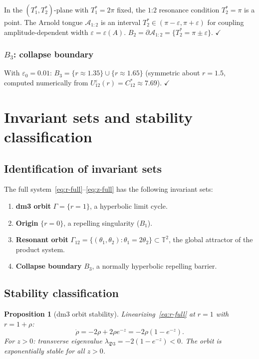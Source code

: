 \documentclass[12pt, oneside]{book}
\theoremstyle{plain}
\newtheorem{proposition}[theorem]{Proposition}
\theoremstyle{definition}
\theoremstyle{remark}
\newcommand{\T}{\mathbb{T}}
\newcommand{\dm}{\mathfrak{D}}
\newcommand{\Orb}{\Gamma}
\newcommand{\eps}{\varepsilon}
\begin{document}
In the $(T_1^*,T_2^*)$-plane with $T_1^*=2\pi$ fixed, the $1$:$2$
resonance condition $T_2^*=\pi$ is a point. The Arnold tongue
$\mathcal{A}_{1:2}$ is an interval $T_2^*\in(\pi-\eps,\pi+\eps)$
for coupling amplitude-dependent width $\eps=\eps(A)$.
$B_2=\partial\mathcal{A}_{1:2}=\{T_2^*=\pi\pm\eps\}$. $\checkmark$

\subsubsection{$B_3$: collapse boundary}

With $\eps_0=0.01$: $B_3=\{r\approx 1.35\}\cup\{r\approx 1.65\}$
(symmetric about $r=1.5$, computed numerically from
$U_{12}^\eps(r)=C_{12}^*\approx 7.69$). $\checkmark$

\section{Invariant sets and stability classification}\label{sec:invariants}

\subsection{Identification of invariant sets}

The full system~\eqref{eq:r-full}--\eqref{eq:z-full}
has the following invariant sets:

\begin{enumerate}[label=(\arabic*)]
  \item \textbf{dm3 orbit} $\Orb=\{r=1\}$, a hyperbolic limit cycle.
  \item \textbf{Origin} $\{r=0\}$, a repelling singularity ($B_1$).
  \item \textbf{Resonant orbit} $\Orb_{12}=\{(\theta_1,\theta_2):
        \theta_1=2\theta_2\}\subset\T^2$, the global attractor
        of the product system.
  \item \textbf{Collapse boundary} $B_3$, a normally hyperbolic
        repelling barrier.
\end{enumerate}

\subsection{Stability classification}

\begin{proposition}[dm3 orbit stability]\label{prop:dm3stable}
Linearizing~\eqref{eq:r-full} at $r=1$ with $r=1+\rho$:
\[
  \dot\rho = -2\rho + 2\rho e^{-z} = -2\rho(1-e^{-z}).
\]
For $z>0$: transverse eigenvalue $\lambda_{\dm3}=-2(1-e^{-z})<0$.
The orbit is exponentially stable for all $z>0$.
\end{proposition}
\end{document}
